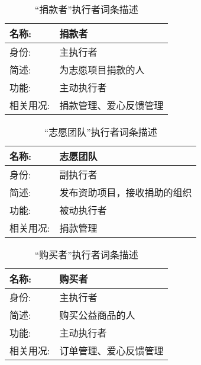 
\begin{table}[H]  
\caption{“捐款者”执行者词条描述}  
\begin{center}  
    \begin{tabular}{l p{11cm}} 
        \hline
        \quad 名称:  &   捐款者 \\
        \hline
        \quad 身份:  & 主执行者 \\
        \hline
        \quad 简述:  & 为志愿项目捐款的人 \\
        \hline
        \quad 功能:  & 主动执行者 \\
        \hline
        \quad 相关用况:  & 捐款管理、爱心反馈管理 \\
        \hline
    \end{tabular}
\end{center}
\end{table}

\begin{table}[H]  
\caption{“志愿团队”执行者词条描述}  
\begin{center}  
    \begin{tabular}{l p{11cm}} 
        \hline
        \quad 名称:  &   志愿团队 \\
        \hline
        \quad 身份:  & 副执行者 \\
        \hline
        \quad 简述:  & 发布资助项目，接收捐助的组织 \\
        \hline
        \quad 功能:  & 被动执行者 \\
        \hline
        \quad 相关用况:  & 捐款管理 \\
        \hline
    \end{tabular}
\end{center}
\end{table}

\begin{table}[H]  
\caption{“购买者”执行者词条描述}  
\begin{center}  
    \begin{tabular}{l p{11cm}} 
        \hline
        \quad 名称:  &   购买者 \\
        \hline
        \quad 身份:  & 主执行者 \\
        \hline
        \quad 简述:  & 购买公益商品的人 \\
        \hline
        \quad 功能:  & 主动执行者 \\
        \hline
        \quad 相关用况:  & 订单管理、爱心反馈管理 \\
        \hline
    \end{tabular}
\end{center}
\end{table}

